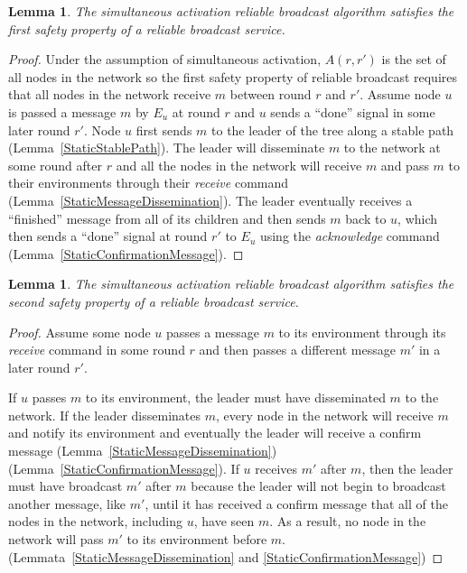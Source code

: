 \documentclass[english]{article}
\newtheorem{lemma}[theorem]{Lemma}
\begin{document}
\begin{lemma}
\label{StaticRBSafety1}
The simultaneous activation reliable broadcast algorithm satisfies the first safety property of a reliable broadcast service.
\end{lemma}
\begin{proof}

Under the assumption of simultaneous activation, $A(r,r')$ is the set of all nodes in the network so the first safety property of reliable broadcast requires that all nodes in the network receive $m$ between round $r$ and $r'$. Assume node $u$ is passed a message $m$ by $E_u$ at round $r$ and $u$ sends  a ``done'' signal in some later round $r'$. Node $u$ first sends $m$ to the leader of the tree along a stable path (Lemma~\ref{StaticStablePath}). The leader will disseminate $m$ to the network at some round after $r$ and all the nodes in the network will receive $m$ and pass $m$ to their environments through their \textit{receive} command (Lemma~\ref{StaticMessageDissemination}). The leader eventually receives a ``finished'' message from all of its children and then sends $m$ back to $u$, which then sends  a ``done'' signal at round $r'$ to $E_u$ using the \textit{acknowledge} command (Lemma~\ref{StaticConfirmationMessage}). 

\end{proof}


\begin{lemma}
\label{StaticRBSafety2}
The simultaneous activation reliable broadcast algorithm satisfies the second safety property of a reliable broadcast service.
\end{lemma}
\begin{proof}

Assume some node $u$ passes a message $m$ to its environment through its \textit{receive} command in some round $r$ and then passes a different message $m'$ in a later round $r'$. 

If $u$ passes $m$ to its environment, the leader must have disseminated $m$ to the network. If the leader disseminates $m$, every node in the network will receive $m$ and notify its environment and eventually the leader will receive a confirm message (Lemma~\ref{StaticMessageDissemination}) (Lemma~\ref{StaticConfirmationMessage}). If $u$ receives $m'$ after $m$, then the leader must have broadcast $m'$ after $m$ because the leader will not begin to broadcast another message, like $m'$, until it has received a confirm message that all of the nodes in the network, including $u$, have seen $m$. As a result, no node in the network will pass $m'$ to its environment before $m$. (Lemmata~\ref{StaticMessageDissemination} and \ref{StaticConfirmationMessage})

\end{proof}
\end{document}

